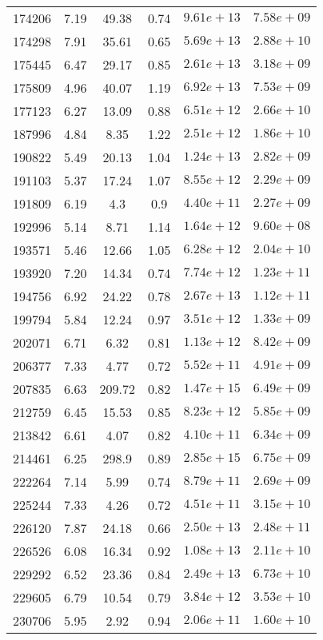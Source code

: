 \begin{table}
\begin{tabular}{cccccc}
174206 & 7.19 & 49.38 & 0.74 & $9.61e+13$ & $7.58e+09$ \\
174298 & 7.91 & 35.61 & 0.65 & $5.69e+13$ & $2.88e+10$ \\
175445 & 6.47 & 29.17 & 0.85 & $2.61e+13$ & $3.18e+09$ \\
175809 & 4.96 & 40.07 & 1.19 & $6.92e+13$ & $7.53e+09$ \\
177123 & 6.27 & 13.09 & 0.88 & $6.51e+12$ & $2.66e+10$ \\
187996 & 4.84 & 8.35 & 1.22 & $2.51e+12$ & $1.86e+10$ \\
190822 & 5.49 & 20.13 & 1.04 & $1.24e+13$ & $2.82e+09$ \\
191103 & 5.37 & 17.24 & 1.07 & $8.55e+12$ & $2.29e+09$ \\
191809 & 6.19 & 4.3 & 0.9 & $4.40e+11$ & $2.27e+09$ \\
192996 & 5.14 & 8.71 & 1.14 & $1.64e+12$ & $9.60e+08$ \\
193571 & 5.46 & 12.66 & 1.05 & $6.28e+12$ & $2.04e+10$ \\
193920 & 7.20 & 14.34 & 0.74 & $7.74e+12$ & $1.23e+11$ \\
194756 & 6.92 & 24.22 & 0.78 & $2.67e+13$ & $1.12e+11$ \\
199794 & 5.84 & 12.24 & 0.97 & $3.51e+12$ & $1.33e+09$ \\
202071 & 6.71 & 6.32 & 0.81 & $1.13e+12$ & $8.42e+09$ \\
206377 & 7.33 & 4.77 & 0.72 & $5.52e+11$ & $4.91e+09$ \\
207835 & 6.63 & 209.72 & 0.82 & $1.47e+15$ & $6.49e+09$ \\
212759 & 6.45 & 15.53 & 0.85 & $8.23e+12$ & $5.85e+09$ \\
213842 & 6.61 & 4.07 & 0.82 & $4.10e+11$ & $6.34e+09$ \\
214461 & 6.25 & 298.9 & 0.89 & $2.85e+15$ & $6.75e+09$ \\
222264 & 7.14 & 5.99 & 0.74 & $8.79e+11$ & $2.69e+09$ \\
225244 & 7.33 & 4.26 & 0.72 & $4.51e+11$ & $3.15e+10$ \\
226120 & 7.87 & 24.18 & 0.66 & $2.50e+13$ & $2.48e+11$ \\
226526 & 6.08 & 16.34 & 0.92 & $1.08e+13$ & $2.11e+10$ \\
229292 & 6.52 & 23.36 & 0.84 & $2.49e+13$ & $6.73e+10$ \\
229605 & 6.79 & 10.54 & 0.79 & $3.84e+12$ & $3.53e+10$ \\
230706 & 5.95 & 2.92 & 0.94 & $2.06e+11$ & $1.60e+10$ \\

\end{tabular}
\end{table}
